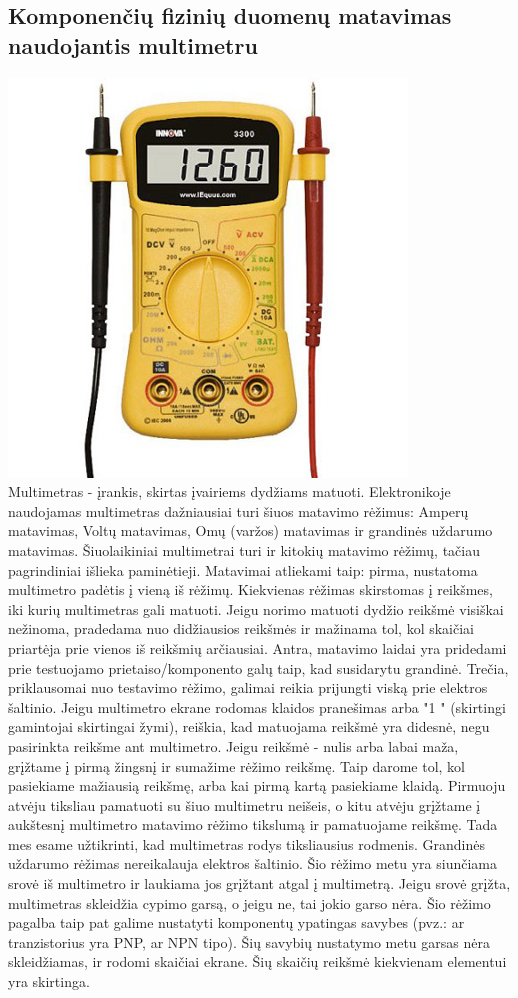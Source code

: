 \documentclass{VUMIFPSkursinis}
\begin{document}
\subsection{Komponenčių fizinių duomenų matavimas naudojantis multimetru}
\includegraphics{img/multimeter}\\
Multimetras - įrankis, skirtas įvairiems dydžiams matuoti. Elektronikoje naudojamas multimetras dažniausiai turi šiuos matavimo rėžimus: Amperų matavimas, Voltų matavimas, Omų (varžos) matavimas ir grandinės uždarumo matavimas. Šiuolaikiniai multimetrai turi ir kitokių matavimo rėžimų, tačiau pagrindiniai išlieka paminėtieji. Matavimai atliekami taip: pirma, nustatoma multimetro padėtis į vieną iš rėžimų. Kiekvienas rėžimas skirstomas į reikšmes, iki kurių multimetras gali matuoti. Jeigu norimo matuoti dydžio reikšmė visiškai nežinoma, pradedama nuo didžiausios reikšmės ir mažinama tol, kol skaičiai priartėja prie vienos iš reikšmių arčiausiai. Antra, matavimo laidai yra pridedami prie testuojamo prietaiso/komponento galų taip, kad susidarytu grandinė. Trečia, priklausomai nuo testavimo rėžimo, galimai reikia prijungti viską prie elektros šaltinio. Jeigu multimetro ekrane rodomas klaidos pranešimas arba "1    " (skirtingi gamintojai skirtingai žymi), reiškia, kad matuojama reikšmė yra didesnė, negu pasirinkta reikšme ant multimetro. Jeigu reikšmė - nulis arba labai maža, grįžtame į pirmą žingsnį ir sumažime rėžimo reikšmę. Taip darome tol, kol pasiekiame mažiausią reikšmę, arba kai pirmą kartą pasiekiame klaidą. Pirmuoju atvėju tiksliau pamatuoti su šiuo multimetru neišeis, o kitu atvėju grįžtame į aukštesnį multimetro matavimo rėžimo tikslumą ir pamatuojame reikšmę. Tada mes esame užtikrinti, kad multimetras rodys tiksliausius rodmenis. Grandinės uždarumo rėžimas nereikalauja elektros šaltinio. Šio rėžimo metu yra siunčiama srovė iš multimetro ir laukiama jos grįžtant atgal į multimetrą. Jeigu srovė grįžta, multimetras skleidžia cypimo garsą, o jeigu ne, tai jokio garso nėra. Šio rėžimo pagalba taip pat galime nustatyti komponentų ypatingas savybes (pvz.: ar tranzistorius yra PNP, ar NPN tipo). Šių savybių nustatymo metu garsas nėra skleidžiamas, ir rodomi skaičiai ekrane. Šių skaičių reikšmė kiekvienam elementui yra skirtinga.
\end{document}
